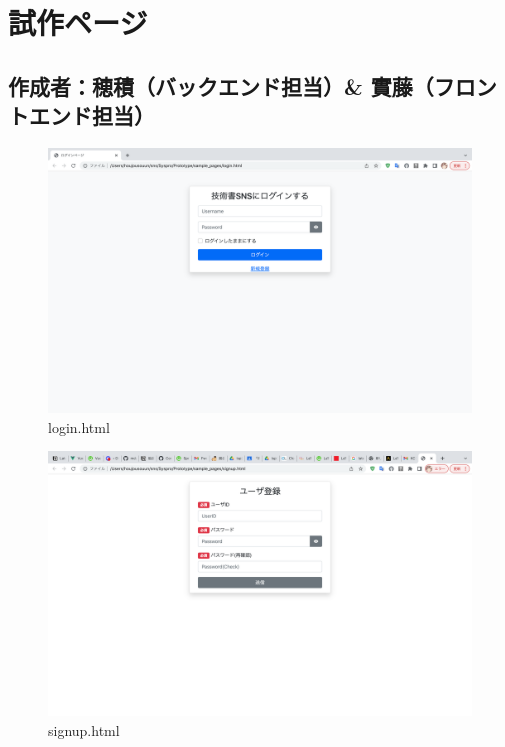 \documentclass[dvipdfmx]{jsarticle}
\begin{document}
    \newpage

    \section*{試作ページ}
    \subsection*{\rm{作成者：穂積（バックエンド担当）\& 實藤（フロントエンド担当）}}
    \begin{figure}[H]
        \begin{center}
            \caption*{login.html}
            \includegraphics[scale=0.3,clip]{pictures/login.png}
        \end{center}
    \end{figure}

    \begin{figure}[H]
        \begin{center}
            \caption*{signup.html}
            \includegraphics[scale=0.3,clip]{pictures/signup.png}
        \end{center}
    \end{figure}
\end{document}
